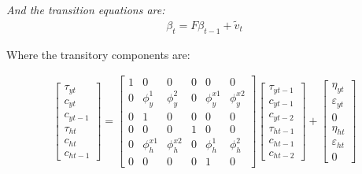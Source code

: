 \documentclass[
  12pt,
]{article}
\begin{document}
        \textit{And the transition equations are:}
        \begin{align}
        \beta_t = F\beta_{t-1} + \tilde{v}_t
        \end{align}
        
        Where the transitory components are:
        
        \begin{align}
        \begin{bmatrix}
        \tau_{yt}   \\
        c_{yt}      \\
        c_{yt-1}        \\
        \tau_{ht}   \\
        c_{ht}      \\
        c_{ht-1}        
        \end{bmatrix}
        =
        \begin{bmatrix}
        1   & 0 & 0 & 0 & 0 & 0 \\
        0   & \phi^1_y  & \phi^2_y  & 0 & \phi^{x1}_y   & \phi^{x2}_y   \\
        0   & 1 & 0 & 0 & 0 & 0  \\
        0   & 0 & 0 & 1 & 0 & 0 \\
        0   & \phi^{x1}_h   & \phi^{x2}_h   & 0 &\phi^1_h   & \phi^2_h  \\
        0   & 0 & 0 & 0 & 1 & 0
        \end{bmatrix}
        \begin{bmatrix}
        \tau_{yt-1} \\
        c_{yt-1}        \\
        c_{yt-2}        \\
        \tau_{ht-1} \\
        c_{ht-1}        \\
        c_{ht-2}        
        \end{bmatrix}
        +
        \begin{bmatrix}
        \eta_{yt}   \\
        \varepsilon_{yt}        \\
        0   \\
        \eta_{ht}   \\
        \varepsilon_{ht}        \\
        0   
        \end{bmatrix}
        \end{align}
        
\end{document}
